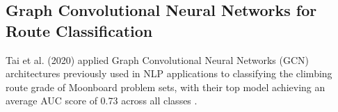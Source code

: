 \documentclass[10pt]{article}
\begin{document}
\subsection{Graph Convolutional Neural Networks for Route Classification}
Tai et al. (2020) applied Graph Convolutional Neural Networks (GCN)
architectures previously used in NLP applications to classifying the climbing
route grade of Moonboard problem sets, with their top model achieving an
average AUC score of 0.73 across all classes \cite{tai_wu_hinojosa_2020}.


\end{document}
